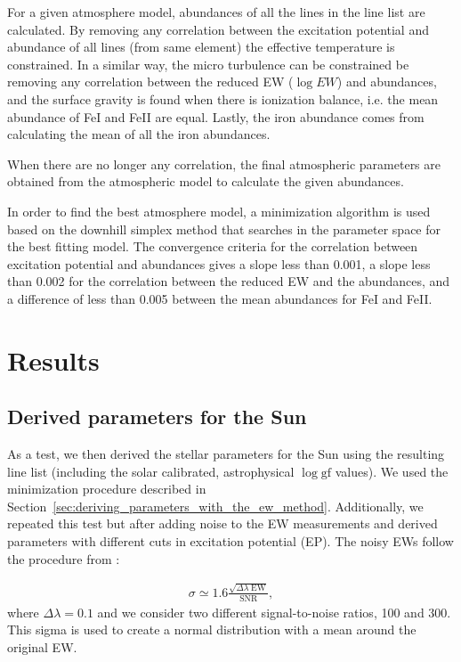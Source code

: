 \documentclass{aa}
\begin{document}
For a given atmosphere model, abundances of all the lines in the line
list are calculated. By removing any correlation between the excitation
potential and abundance of all lines (from same element) the effective
temperature is constrained. In a similar way, the micro turbulence can
be constrained be removing any correlation between the reduced EW ($\log
EW$) and abundances, and the surface gravity is found when there is
ionization balance, i.e. the mean abundance of FeI and FeII are equal.
Lastly, the iron abundance comes from calculating the mean of
all the iron abundances.

When there are no longer any correlation, the final atmospheric
parameters are obtained from the atmospheric model to calculate the
given abundances.

In order to find the best atmosphere model, a minimization algorithm
is used based on the downhill simplex method \citep{Press1992} that
searches in the parameter space for the best fitting model. The
convergence criteria for the correlation between excitation potential
and abundances gives a slope less than 0.001, a slope less than 0.002
for the correlation between the reduced EW and the abundances, and a
difference of less than 0.005 between the mean abundances for FeI and
FeII.







\section{Results}
\label{sec:results}


\subsection{Derived parameters for the Sun}
\label{sec:derived_parameters_of_the_sun}

As a test, we then derived the stellar parameters for the Sun using the
resulting line list (including the solar calibrated, astrophysical $\log
\mathrm{gf}$ values). We used the minimization procedure described in
Section~\ref{sec:deriving_parameters_with_the_ew_method}. Additionally,
we repeated this test but after adding noise to the EW measurements and
derived parameters with different cuts in excitation potential (EP). The
noisy EWs follow the procedure from \cite{Caryel1988}:

\begin{align}
    \sigma \simeq 1.6 \frac{\sqrt{\Delta\lambda\; \mathrm{EW}}}{\mathrm{SNR}},
\end{align}
where $\Delta\lambda=0.1$ and we consider two different signal-to-noise
ratios, 100 and 300. This sigma is used to create a normal distribution
with a mean around the original EW.
\end{document}

